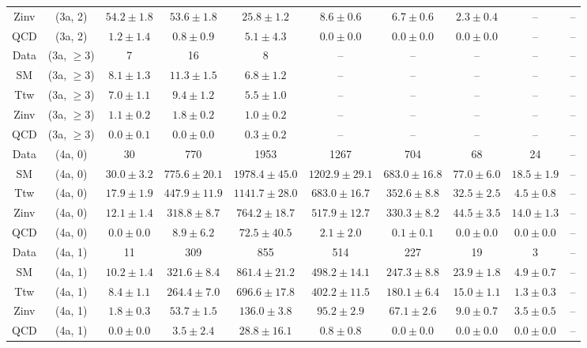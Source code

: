 \begin{table}[h!]
{\begin{tabular}{cccccccccc}
	Zinv & (3a, 2) & $54.2\pm 1.8$ & $53.6\pm 1.8$ & $25.8\pm 1.2$ & $8.6\pm 0.6$ & $6.7\pm 0.6$ & $2.3\pm 0.4$ & -- & -- \\[0.5ex] 
	QCD & (3a, 2) & $1.2\pm 1.4$ & $0.8\pm 0.9$ & $5.1\pm 4.3$ & $0.0\pm 0.0$ & $0.0\pm 0.0$ & $0.0\pm 0.0$ & -- & -- \\[0.5ex] 
	Data & (3a, $\ge3$) & 7 & 16 & 8 & -- & -- & -- & -- & -- \\[0.5ex] 
	SM & (3a, $\ge3$) & $8.1\pm 1.3$ & $11.3\pm 1.5$ & $6.8\pm 1.2$ & -- & -- & -- & -- & -- \\[0.5ex] 
	Ttw & (3a, $\ge3$) & $7.0\pm 1.1$ & $9.4\pm 1.2$ & $5.5\pm 1.0$ & -- & -- & -- & -- & -- \\[0.5ex] 
	Zinv & (3a, $\ge3$) & $1.1\pm 0.2$ & $1.8\pm 0.2$ & $1.0\pm 0.2$ & -- & -- & -- & -- & -- \\[0.5ex] 
	QCD & (3a, $\ge3$) & $0.0\pm 0.1$ & $0.0\pm 0.0$ & $0.3\pm 0.2$ & -- & -- & -- & -- & -- \\[0.5ex] 
	Data & (4a, 0) & 30 & 770 & 1953 & 1267 & 704 & 68 & 24 & -- \\[0.5ex] 
	SM & (4a, 0) & $30.0\pm 3.2$ & $775.6\pm 20.1$ & $1978.4\pm 45.0$ & $1202.9\pm 29.1$ & $683.0\pm 16.8$ & $77.0\pm 6.0$ & $18.5\pm 1.9$ & -- \\[0.5ex] 
	Ttw & (4a, 0) & $17.9\pm 1.9$ & $447.9\pm 11.9$ & $1141.7\pm 28.0$ & $683.0\pm 16.7$ & $352.6\pm 8.8$ & $32.5\pm 2.5$ & $4.5\pm 0.8$ & -- \\[0.5ex] 
	Zinv & (4a, 0) & $12.1\pm 1.4$ & $318.8\pm 8.7$ & $764.2\pm 18.7$ & $517.9\pm 12.7$ & $330.3\pm 8.2$ & $44.5\pm 3.5$ & $14.0\pm 1.3$ & -- \\[0.5ex] 
	QCD & (4a, 0) & $0.0\pm 0.0$ & $8.9\pm 6.2$ & $72.5\pm 40.5$ & $2.1\pm 2.0$ & $0.1\pm 0.1$ & $0.0\pm 0.0$ & $0.0\pm 0.0$ & -- \\[0.5ex] 
	Data & (4a, 1) & 11 & 309 & 855 & 514 & 227 & 19 & 3 & -- \\[0.5ex] 
	SM & (4a, 1) & $10.2\pm 1.4$ & $321.6\pm 8.4$ & $861.4\pm 21.2$ & $498.2\pm 14.1$ & $247.3\pm 8.8$ & $23.9\pm 1.8$ & $4.9\pm 0.7$ & -- \\[0.5ex] 
	Ttw & (4a, 1) & $8.4\pm 1.1$ & $264.4\pm 7.0$ & $696.6\pm 17.8$ & $402.2\pm 11.5$ & $180.1\pm 6.4$ & $15.0\pm 1.1$ & $1.3\pm 0.3$ & -- \\[0.5ex] 
	Zinv & (4a, 1) & $1.8\pm 0.3$ & $53.7\pm 1.5$ & $136.0\pm 3.8$ & $95.2\pm 2.9$ & $67.1\pm 2.6$ & $9.0\pm 0.7$ & $3.5\pm 0.5$ & -- \\[0.5ex] 
	QCD & (4a, 1) & $0.0\pm 0.0$ & $3.5\pm 2.4$ & $28.8\pm 16.1$ & $0.8\pm 0.8$ & $0.0\pm 0.0$ & $0.0\pm 0.0$ & $0.0\pm 0.0$ & -- \\[0.5ex] 

\end{tabular}}
\end{table}
